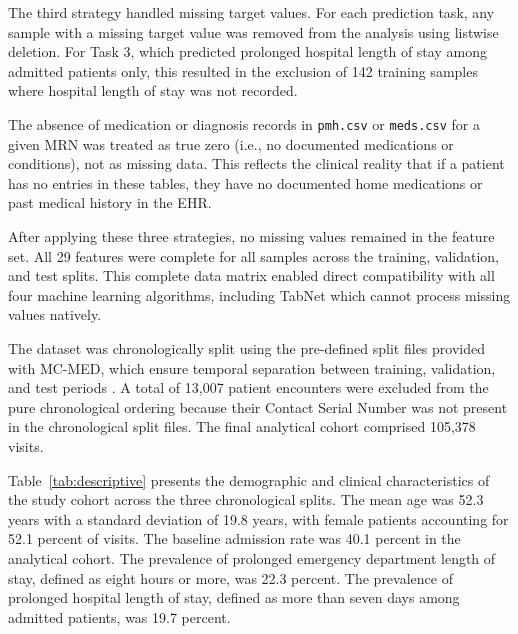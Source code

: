 \documentclass[harvard,article]{frontiersinFPHY_FAMS}
\begin{document}
The third strategy handled missing target values. For each prediction task, any sample with a missing target value was removed from the analysis using listwise deletion. For Task 3, which predicted prolonged hospital length of stay among admitted patients only, this resulted in the exclusion of 142 training samples where hospital length of stay was not recorded.

The absence of medication or diagnosis records in \texttt{pmh.csv} or \texttt{meds.csv} for a given MRN was treated as true zero (i.e., no documented medications or conditions), not as missing data. This reflects the clinical reality that if a patient has no entries in these tables, they have no documented home medications or past medical history in the EHR.

After applying these three strategies, no missing values remained in the feature set. All 29 features were complete for all samples across the training, validation, and test splits. This complete data matrix enabled direct compatibility with all four machine learning algorithms, including TabNet which cannot process missing values natively.

The dataset was chronologically split using the pre-defined split files provided with MC-MED, which ensure temporal separation between training, validation, and test periods \cite{kansal2025}. A total of 13,007 patient encounters were excluded from the pure chronological ordering because their Contact Serial Number was not present in the chronological split files. The final analytical cohort comprised 105,378 visits.

Table~\ref{tab:descriptive} presents the demographic and clinical characteristics of the study cohort across the three chronological splits. The mean age was 52.3 years with a standard deviation of 19.8 years, with female patients accounting for 52.1 percent of visits. The baseline admission rate was 40.1 percent in the analytical cohort. The prevalence of prolonged emergency department length of stay, defined as eight hours or more, was 22.3 percent. The prevalence of prolonged hospital length of stay, defined as more than seven days among admitted patients, was 19.7 percent.
\end{document}

